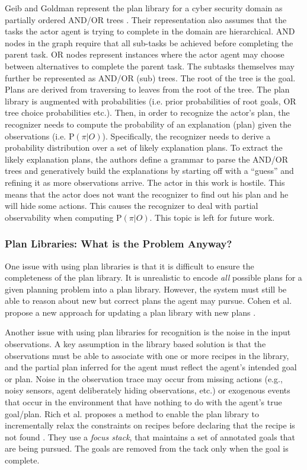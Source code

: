 Geib and Goldman represent the plan library for a cyber security domain as partially ordered AND/OR trees \cite{GeibGoldman09}. 
Their representation also assumes that the tasks the actor agent is trying to complete in the domain are hierarchical. 
AND nodes in the graph require that all sub-tasks be achieved before completing the parent task. 
OR nodes represent instances where the actor agent may choose between alternatives to complete the parent task. 
The subtasks themselves may further be represented as AND/OR (sub) trees. The root of the tree is the goal. Plans are derived from traversing to leaves from the root of the tree. The plan library is augmented with probabilities (i.e. prior probabilities of root goals, OR tree choice probabilities etc.).
Then, in order to recognize the actor's plan, the recognizer needs to compute the probability of an explanation (plan) given the observations (i.e. P$(\pi|O)$). 
Specifically, the recognizer needs to derive a probability distribution over a set of likely explanation plans. 
To extract the likely explanation plans, the authors define a grammar to parse the AND/OR trees and generatively build the explanations by starting off with a ``guess'' and refining it as more observations arrive. 
The actor in this work is hostile. This means that the actor does not want the recognizer to find out his plan and he will hide some actions. 
This causes the recognizer to deal with partial observability when computing P$(\pi|O)$. 
This topic is left for future work.

\subsubsection{Plan Libraries: What is the Problem Anyway?}
One issue with using plan libraries is that it is difficult to ensure the completeness of the plan library. It is unrealistic to encode \textit{all} possible plans for a given planning problem into a plan library. However, the system must still be able to reason about new but correct plans the agent may pursue. Cohen et al. propose a new approach for updating a plan library with new plans \cite{spencer1993}.

Another issue with using plan libraries for recognition is the noise in the input observations. A key assumption in the library based solution is that the observations must be able to associate with one or more recipes in the library, and the partial plan inferred for the agent must reflect the agent's intended goal or plan. Noise in the observation trace may occur from missing actions (e.g., noisy sensors, agent deliberately hiding observations, etc.) or exogenous events that occur in the environment that have nothing to do with the agent's true goal/plan. Rich et al. proposes  a method to enable the plan library to incrementally relax the constraints on recipes before declaring that the recipe is not found \cite{rich2001collagen}. They use a \textit{focus stack}, that maintains a set of annotated goals that are being pursued. The goals are removed from the tack only when the goal is complete.


